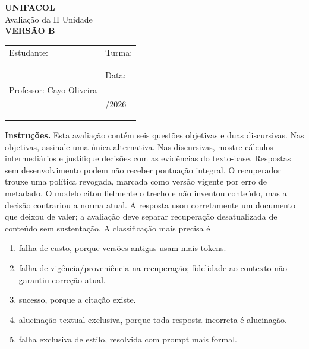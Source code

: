\documentclass[12pt,a4paper]{article}
\begin{document}
\begin{center}
{\Large\bfseries UNIFACOL}\\[2mm]
{\large Avaliação da II Unidade}\\[1mm]
{\Large\bfseries VERSÃO B}
\end{center}
\begin{DocumentBox}[Identificação]
\begin{tabularx}{\textwidth}{@{}p{}p{}@{}}
Estudante: \hrulefill & Turma: \hrulefill\\[3mm]
Professor: Cayo Oliveira & Data: \rule{2.7cm}{.2pt}/2026
\end{tabularx}
\end{DocumentBox}
\textbf{Instruções.} Esta avaliação contém seis questões objetivas e duas discursivas. Nas objetivas, assinale uma única alternativa. Nas discursivas, mostre cálculos intermediários e justifique decisões com as evidências do texto-base. Respostas sem desenvolvimento podem não receber pontuação integral.
\bigskip
\TextoBase
O recuperador trouxe uma política revogada, marcada como versão vigente por erro de metadado. O modelo citou fielmente o trecho e não inventou conteúdo, mas a decisão contrariou a norma atual.
A resposta usou corretamente um documento que deixou de valer; a avaliação deve separar recuperação desatualizada de conteúdo sem sustentação.
\FonteDidatica
\Comando A classificação mais precisa é
\begin{enumerate}[label=\Alph*)]
  \item falha de custo, porque versões antigas usam mais tokens.
  \item falha de vigência/proveniência na recuperação; fidelidade ao contexto não garantiu correção atual.
  \item sucesso, porque a citação existe.
  \item alucinação textual exclusiva, porque toda resposta incorreta é alucinação.
  \item falha exclusiva de estilo, resolvida com prompt mais formal.
\end{enumerate}
\end{document}
